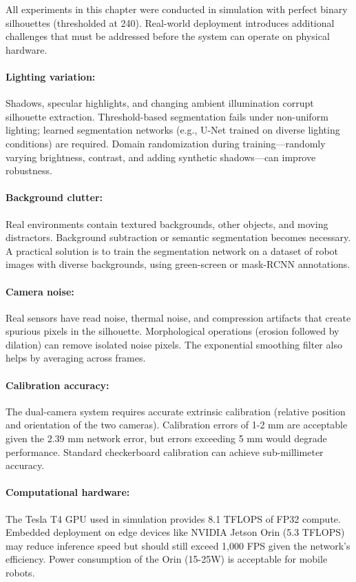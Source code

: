\documentclass[12pt,a4paper,oneside]{report}
\begin{document}
All experiments in this chapter were conducted in simulation with perfect binary silhouettes (thresholded at 240). Real-world deployment introduces additional challenges that must be addressed before the system can operate on physical hardware.

\paragraph{Lighting variation:} Shadows, specular highlights, and changing ambient illumination corrupt silhouette extraction. Threshold-based segmentation fails under non-uniform lighting; learned segmentation networks (e.g., U-Net trained on diverse lighting conditions) are required. Domain randomization during training---randomly varying brightness, contrast, and adding synthetic shadows---can improve robustness.

\paragraph{Background clutter:} Real environments contain textured backgrounds, other objects, and moving distractors. Background subtraction or semantic segmentation becomes necessary. A practical solution is to train the segmentation network on a dataset of robot images with diverse backgrounds, using green-screen or mask-RCNN annotations.

\paragraph{Camera noise:} Real sensors have read noise, thermal noise, and compression artifacts that create spurious pixels in the silhouette. Morphological operations (erosion followed by dilation) can remove isolated noise pixels. The exponential smoothing filter also helps by averaging across frames.

\paragraph{Calibration accuracy:} The dual-camera system requires accurate extrinsic calibration (relative position and orientation of the two cameras). Calibration errors of 1-2 mm are acceptable given the 2.39 mm network error, but errors exceeding 5 mm would degrade performance. Standard checkerboard calibration can achieve sub-millimeter accuracy.

\paragraph{Computational hardware:} The Tesla T4 GPU used in simulation provides 8.1 TFLOPS of FP32 compute. Embedded deployment on edge devices like NVIDIA Jetson Orin (5.3 TFLOPS) may reduce inference speed but should still exceed 1,000 FPS given the network's efficiency. Power consumption of the Orin (15-25W) is acceptable for mobile robots.
\end{document}
